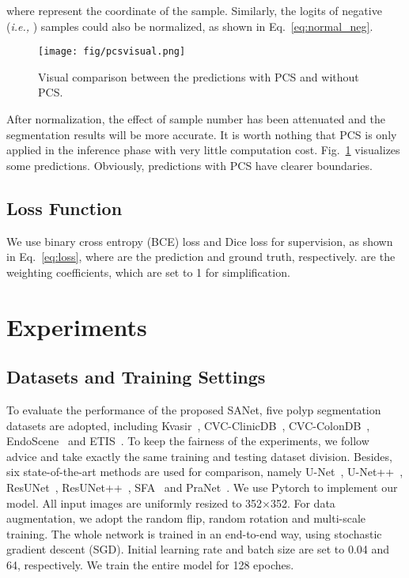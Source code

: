 \documentclass[runningheads]{llncs}
\begin{document}
where  represent the coordinate of the sample. Similarly, the logits of negative ({\it i.e.,} ) samples could also be normalized, as shown in Eq.~\ref{eq:normal_neg}.



\begin{figure}[t]
  \centering
  \texttt{[image: fig/pcsvisual.png]}
  \caption{Visual comparison between the predictions with PCS and without PCS.}
  \label{fig:visualization:pcs}
\end{figure}
After normalization, the effect of sample number has been attenuated and the segmentation results will be more accurate. It is worth nothing that PCS is only applied in the inference phase with very little computation cost. Fig.~\ref{fig:visualization:pcs} visualizes some predictions. Obviously, predictions with PCS have clearer boundaries.

\subsection{Loss Function}
We use binary cross entropy (BCE) loss and Dice loss for supervision, as shown in Eq.~\ref{eq:loss}, where  are the prediction and ground truth, respectively.  are the weighting coefficients, which are set to 1 for simplification.


\section{Experiments}
\subsection{Datasets and Training Settings}
To evaluate the performance of the proposed SANet, five polyp segmentation datasets are adopted, including Kvasir~\cite{jha2020kvasir}, CVC-ClinicDB~\cite{bernal2015wm}, CVC-ColonDB~\cite{bernal2012towards},  EndoScene~\cite{vazquez2017benchmark} and ETIS~\cite{silva2014toward}. To keep the fairness of the experiments, we follow~\cite{fan2020pranet} advice and take exactly the same training and testing dataset division. Besides, six state-of-the-art methods are used for comparison, namely U-Net~\cite{ronneberger2015u}, U-Net++~\cite{zhou2018unet++}, ResUNet~\cite{zhang2018road}, ResUNet++~\cite{jha2019resunet++}, SFA~\cite{fang2019selective} and PraNet~\cite{fan2020pranet}. We use Pytorch to implement our model. All input images are uniformly resized to 352×352. For data augmentation, we adopt the random flip, random rotation and multi-scale training. The whole network is trained in an end-to-end way, using stochastic gradient descent (SGD). Initial learning rate and batch size are set to 0.04 and 64, respectively. We train the entire model for 128 epoches.
\end{document}
